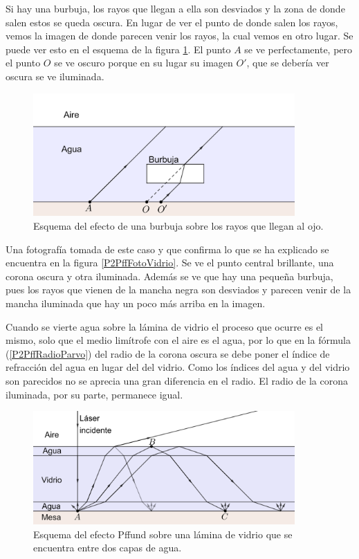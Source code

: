 \documentclass[12pt]{article}
\numberwithin{table}{section}
\numberwithin{figure}{section}
\numberwithin{equation}{section}
\begin{document}
Si hay una burbuja, los rayos que llegan a ella son desviados y la zona de donde salen estos se queda oscura. En lugar de ver el punto de donde salen los rayos, vemos la imagen de donde parecen venir los rayos, la cual vemos en otro lugar. Se puede ver esto en el esquema de la figura \ref{P2PffBurbuja}. El punto $A$ se ve perfectamente, pero el punto $O$ se ve oscuro porque en su lugar su imagen $O'$, que se debería ver oscura se ve iluminada.

\begin{figure}[!ht]
	\small \centering \sffamily
	\begin{center}
		\includegraphics[width=10cm]{P2PffBurbuja.png}
		\caption{Esquema del efecto de una burbuja sobre los rayos que llegan al ojo.}
		\label{P2PffBurbuja}
	\end{center}
\end{figure}

Una fotografía tomada de este caso y que confirma lo que se ha explicado se encuentra en la figura \ref{P2PffFotoVidrio}. Se ve el punto central brillante, una corona oscura y otra iluminada. Además se ve que hay una pequeña burbuja, pues los rayos que vienen de la mancha negra son desviados y parecen venir de la mancha iluminada que hay un poco más arriba en la imagen.

Cuando se vierte agua sobre la lámina de vidrio el proceso que ocurre es el mismo, solo que el medio limítrofe con el aire es el agua, por lo que en la fórmula (\ref{P2PffRadioParvo}) del radio de la corona oscura se debe poner el índice de refracción del agua en lugar del del vidrio. Como los índices del agua y del vidrio son parecidos no se aprecia una gran diferencia en el radio. El radio de la corona iluminada, por su parte, permanece igual.

\begin{figure}[!ht]
	\small \centering \sffamily
	\begin{center}
		\includegraphics[width=10cm]{P2PffAgria.png}
		\caption{Esquema del efecto Pffund sobre una lámina de vidrio que se encuentra entre dos capas de agua.}
		\label{P2PffAgria}
	\end{center}
\end{figure}
\end{document}

